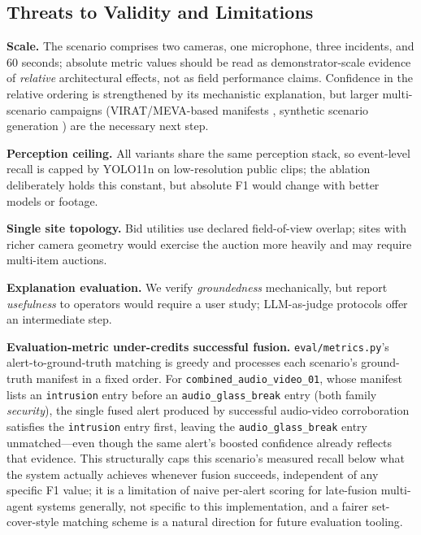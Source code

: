 \subsection{Threats to Validity and Limitations}
\label{sec:threats}

\textbf{Scale.} The scenario comprises two cameras, one microphone, three incidents, and 60 seconds; absolute metric values should be read as demonstrator-scale evidence of \emph{relative} architectural effects, not as field performance claims. Confidence in the relative ordering is strengthened by its mechanistic explanation, but larger multi-scenario campaigns (VIRAT/MEVA-based manifests \cite{tan2025how}, synthetic scenario generation \cite{delussu2024synthetic}) are the necessary next step.

\textbf{Perception ceiling.} All variants share the same perception stack, so event-level recall is capped by YOLO11n on low-resolution public clips; the ablation deliberately holds this constant, but absolute F1 would change with better models or footage.

\textbf{Single site topology.} Bid utilities use declared field-of-view overlap; sites with richer camera geometry would exercise the auction more heavily and may require multi-item auctions.

\textbf{Explanation evaluation.} We verify \emph{groundedness} mechanically, but report \emph{usefulness} to operators would require a user study; LLM-as-judge protocols \cite{zheng2023judging} offer an intermediate step.

\textbf{Evaluation-metric under-credits successful fusion.} \texttt{eval/metrics.py}'s alert-to-ground-truth matching is greedy and processes each scenario's ground-truth manifest in a fixed order. For \texttt{combined\_audio\_video\_01}, whose manifest lists an \texttt{intrusion} entry before an \texttt{audio\_glass\_break} entry (both family \emph{security}), the single fused alert produced by successful audio-video corroboration satisfies the \texttt{intrusion} entry first, leaving the \texttt{audio\_glass\_break} entry unmatched---even though the same alert's boosted confidence already reflects that evidence. This structurally caps this scenario's measured recall below what the system actually achieves whenever fusion succeeds, independent of any specific F1 value; it is a limitation of naive per-alert scoring for late-fusion multi-agent systems generally, not specific to this implementation, and a fairer set-cover-style matching scheme is a natural direction for future evaluation tooling.

